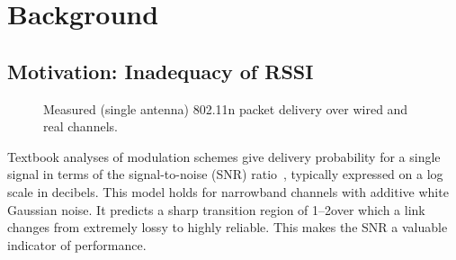 \ifx\mainfile\undefined

\setcounter{chapter}{1} %
\fi

\cleardoublepage
\chapter{Background}
\label{chap:background}

\section{Motivation: Inadequacy of RSSI}
\begin{figure}[t]
	\centering
\hfill%
\hfill%
\hfill%
	\caption[Packet delivery over wired and real 802.11 channels]{\label{fig:rssi_predictions}Measured (single antenna) 802.11n packet delivery over wired and real channels.}%
\end{figure}
Textbook analyses of modulation schemes give delivery probability for a single signal in terms of the signal-to-noise (SNR) ratio~\cite{Goldsmith}, %
typically expressed on a log scale in decibels.
This model holds for narrowband channels with additive white Gaussian noise. It predicts a sharp transition region of 1--2\dB over which a link changes from extremely lossy to highly reliable. This makes the SNR a valuable indicator of performance.

